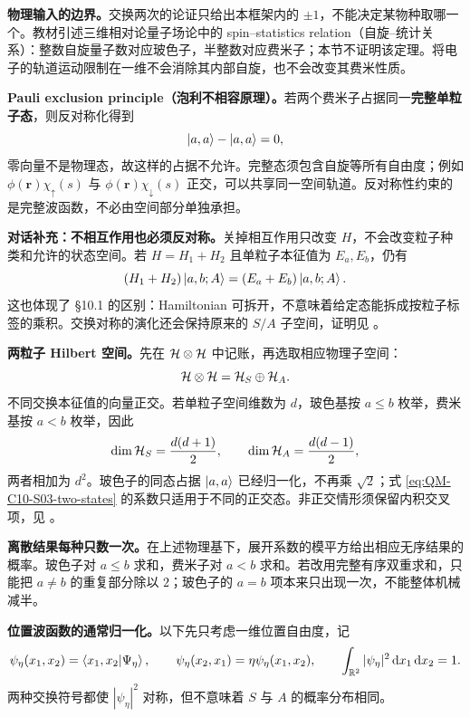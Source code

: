 \textbf{物理输入的边界。}交换两次的论证只给出本框架内的 $\pm1$，不能决定某物种取哪一个。教材引述三维相对论量子场论中的 spin--statistics relation（自旋--统计关系）：整数自旋量子数对应玻色子，半整数对应费米子；本节不证明该定理。将电子的轨道运动限制在一维不会消除其内部自旋，也不会改变其费米性质。

\textbf{Pauli exclusion principle（泡利不相容原理）。}若两个费米子占据同一\textbf{完整单粒子态}，则反对称化得到
\begin{equation}
  \left|a,a\right\rangle-\left|a,a\right\rangle=0,
\end{equation}
零向量不是物理态，故这样的占据不允许。完整态须包含自旋等所有自由度；例如 $\phi(\mathbf r)\chi_\uparrow(s)$ 与 $\phi(\mathbf r)\chi_\downarrow(s)$ 正交，可以共享同一空间轨道。反对称性约束的是完整波函数，不必由空间部分单独承担。

\textbf{对话补充：不相互作用也必须反对称。}关掉相互作用只改变 $H$，不会改变粒子种类和允许的状态空间。若 $H=H_1+H_2$ 且单粒子本征值为 $E_a,E_b$，仍有
\begin{equation}
  (H_1+H_2)\left|a,b;A\right\rangle=(E_a+E_b)\left|a,b;A\right\rangle.
\end{equation}
这也体现了 \S 10.1 的区别：Hamiltonian 可拆开，不意味着给定态能拆成按粒子标签的乘积。交换对称的演化还会保持原来的 $S/A$ 子空间，证明见 。

\textbf{两粒子 Hilbert 空间。}先在 $\mathcal{H}\otimes\mathcal{H}$ 中记账，再选取相应物理子空间：
\begin{equation}
  \mathcal{H}\otimes\mathcal{H}=\mathcal{H}_S\oplus\mathcal{H}_A.
\end{equation}
不同交换本征值的向量正交。若单粒子空间维数为 $d$，玻色基按 $a\le b$ 枚举，费米基按 $a<b$ 枚举，因此
\begin{equation}
  \dim\mathcal{H}_S=\frac{d(d+1)}2,\qquad
  \dim\mathcal{H}_A=\frac{d(d-1)}2,
\end{equation}
两者相加为 $d^2$。玻色子的同态占据 $\left|a,a\right\rangle$ 已经归一化，不再乘 $\sqrt2$；式 \eqref{eq:QM-C10-S03-two-states} 的系数只适用于不同的正交态。非正交情形须保留内积交叉项，见 。

\textbf{离散结果每种只数一次。}在上述物理基下，展开系数的模平方给出相应无序结果的概率。玻色子对 $a\le b$ 求和，费米子对 $a<b$ 求和。若改用完整有序双重求和，只能把 $a\ne b$ 的重复部分除以 $2$；玻色子的 $a=b$ 项本来只出现一次，不能整体机械减半。

\textbf{位置波函数的通常归一化。}以下先只考虑一维位置自由度，记
\begin{equation}
  \psi_\eta(x_1,x_2)=\left\langle x_1,x_2 \middle| \Psi_\eta \right\rangle,\qquad
  \psi_\eta(x_2,x_1)=\eta\psi_\eta(x_1,x_2),\qquad
  \int_{\mathbb{R}^2}|\psi_\eta|^2\mathop{}\!\mathrm{d} x_1\mathop{}\!\mathrm{d} x_2=1.
\end{equation}
两种交换符号都使 $|\psi_\eta|^2$ 对称，但不意味着 $S$ 与 $A$ 的概率分布相同。

